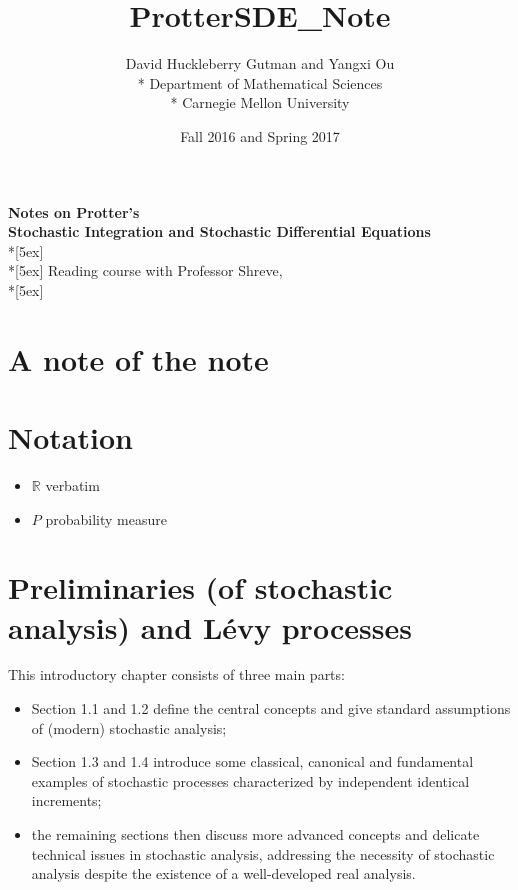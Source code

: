 \documentclass[openany,oneside]{book}
\title{ProtterSDE_Note}
\author{David Huckleberry Gutman and Yangxi Ou \\* Department of Mathematical Sciences \\* Carnegie Mellon University}
\date{Fall 2016 and Spring 2017}
\theoremstyle{definition}
\theoremstyle{remark}
\begin{document}
\frontmatter

\begin{center}	
	\textbf{\Large Notes on Protter's \\ Stochastic Integration and Stochastic Differential Equations} \\*[5ex]
	\theauthor \\*[5ex]
	Reading course with Professor Shreve, \thedate \\*[5ex]
	\tableofcontents
\end{center}


\chapter{A note of the note}

\chapter{Notation}
\begin{itemize}
\item $\mathbb{R}$ verbatim
\item $P$ probability measure

\end{itemize}


\mainmatter

\chapter{Preliminaries (of stochastic analysis) and L\'evy processes}

This introductory chapter consists of three main parts:
\begin{itemize}
\item Section 1.1 and 1.2 define the central concepts and give standard assumptions of (modern) stochastic analysis;
\item Section 1.3 and 1.4 introduce some classical, canonical and fundamental examples of stochastic processes characterized by independent identical increments;
\item the remaining sections then discuss more advanced concepts and delicate technical issues in stochastic analysis, addressing the necessity of stochastic analysis despite the existence of a well-developed real analysis.
\end{itemize}
\end{document}
